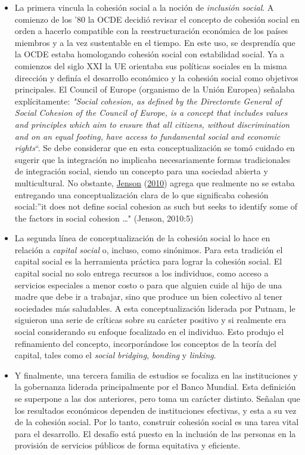 \documentclass[
  12pt,
]{book}
\begin{document}
\begin{itemize}
\item
  La primera vincula la cohesión social a la noción de \emph{inclusión social}. A comienzo de los '80 la OCDE decidió revisar el concepto de cohesión social en orden a hacerlo compatible con la reestructuración económica de los países miembros y a la vez sustentable en el tiempo. En este uso, se desprendía que la OCDE estaba homologando cohesión social con estabilidad social. Ya a comienzos del siglo XXI la UE orientaba sus políticas sociales en la misma dirección y definía el desarrollo económico y la cohesión social como objetivos principales. El Council of Europe (organismo de la Unión Europea) señalaba explícitamente: \emph{"Social cohesion, as defined by the Directorate General of Social Cohesion of the Council of Europe, is a concept that includes values and principles which aim to ensure that all citizens, without discrimination and on an equal footing, have access to fundamental social and economic rights}``. Se debe considerar que en esta conceptualización se tomó cuidado en sugerir que la integración no implicaba necesariamente formas tradicionales de integración social, siendo un concepto para una sociedad abierta y multicultural. No obstante, \protect\hyperlink{ref-jenson2010defining}{Jenson} (\protect\hyperlink{ref-jenson2010defining}{2010}) agrega que realmente no se estaba entregando una conceptualización clara de lo que significaba cohesión social:''it does not define social cohesion as such but seeks to identify some of the factors in social cohesion \ldots" (Jenson, 2010:5)
\item
  La segunda línea de conceptualización de la cohesión social lo hace en relación a \emph{capital social} o, incluso, como sinónimos. Para esta tradición el capital social es la herramienta práctica para lograr la cohesión social. El capital social no solo entrega recursos a los individuos, como acceso a servicios especiales a menor costo o para que alguien cuide al hijo de una madre que debe ir a trabajar, sino que produce un bien colectivo al tener sociedades más saludables. A esta conceptualización liderada por Putnam, le siguieron una serie de críticas sobre su carácter positivo y si realmente era social considerando su enfoque focalizado en el individuo. Esto produjo el refinamiento del concepto, incorporándose los conceptos de la teoría del capital, tales como el \emph{social bridging}, \emph{bonding} y \emph{linking}.
\item
  Y finalmente, una tercera familia de estudios se focaliza en las instituciones y la gobernanza liderada principalmente por el Banco Mundial. Esta definición se superpone a las dos anteriores, pero toma un carácter distinto. Señalan que los resultados económicos dependen de instituciones efectivas, y esta a su vez de la cohesión social. Por lo tanto, construir cohesión social es una tarea vital para el desarrollo. El desafío está puesto en la inclusión de las personas en la provisión de servicios públicos de forma equitativa y eficiente.
\end{itemize}
\end{document}
